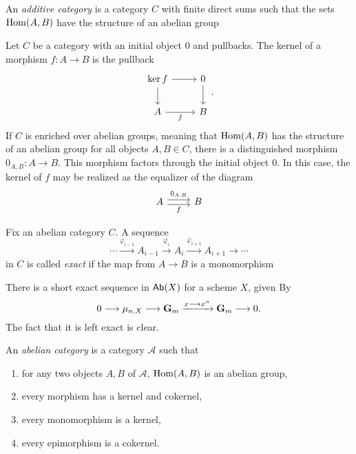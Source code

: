 \begin{definition}
	An \textit{additive category} is a category $C$ with finite direct sums such that the sets $\operatorname{Hom}(A,B)$ have the structure of an abelian group 
\end{definition}

\begin{definition}[Kernels]
	Let $C$ be a category with an initial object $0$ and pullbacks. The kernel of a morphism $f: A \to B$ is the pullback
	\[
		\begin{tikzcd}
			{\ker f} & 0 \\
			A & B
			\arrow[from=1-1, to=2-1]
			\arrow[from=1-1, to=1-2]
			\arrow["f"', from=2-1, to=2-2]
			\arrow[from=1-2, to=2-2]
		\end{tikzcd}.
	\]
	If $C$ is enriched over abelian groups, meaning that $\operatorname{Hom}(A,B)$ has the structure of an abelian group for all objects $A,B \in C$, there is a distinguished morphism $0_{A,B} : A \to B$. This morphism factors through the initial object $0$. In this case, the kernel of $f$ may be realized as the equalizer of the diagram
	\[
		\begin{tikzcd}
			A & B
			\arrow["f"', shift right=1, from=1-1, to=1-2]
			\arrow["{0_{A,B}}", shift left=1, from=1-1, to=1-2]
		\end{tikzcd}		
	\]
\end{definition}

\begin{definition}
	Fix an abelian category $C$.  A sequence 
	\[ \cdots \xrightarrow{\varphi_{i-1}} A_{i-1} \xrightarrow{\varphi_{i}} A_{i} \xrightarrow{\varphi_{i+1}} A_{i+1} \to \cdots\]
	in $C$ is called \textit{exact} if the map from $A \to B$ is a monomorphism
\end{definition}

\begin{example}
	There is a short exact sequence in $\mathsf{Ab}(X)$ for a scheme $X$, given By
	\[
		0 \longrightarrow \mu_{n,X} \longrightarrow \mathbf{G}_m \xrightarrow{x \longrightarrow x^n} \mathbf{G}_m \longrightarrow 0.
	\]
	The fact that it is left exact is clear.
\end{example}

\begin{remark}
	An \textit{abelian category} is a category $\mathcal{A}$ such that
	\begin{enumerate}
		\item for any two objects $A,B$ of $\mathcal{A}$, $\operatorname{Hom}(A,B)$ is an abelian group,
		\item every morphism has a kernel and cokernel,
		\item every monomorphism is a kernel,
		\item every epimorphism is a cokernel.
	\end{enumerate}
\end{remark}

